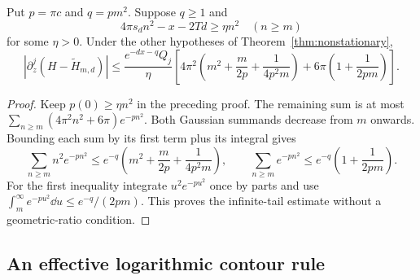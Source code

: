 \begin{lemma}\label{lem:gaussian-tail}
Put $p=\pi c$ and $q=pm^2$. Suppose $q\ge1$ and
\[
 4\pi s_d n^2-x-2Td\ge\eta n^2\quad(n\ge m)
\]
for some $\eta>0$. Under the other hypotheses of
Theorem~\ref{thm:nonstationary},
\begin{equation}\label{eq:gaussian-tail}
 \left|\partial_z^j(H-\widetilde H_{m,d})\right|
 \le\frac{e^{-dx-q}Q_j}{\eta}
 \left[4\pi^2\left(m^2+\frac m{2p}+\frac1{4p^2m}\right)
       +6\pi\left(1+\frac1{2pm}\right)\right].
\end{equation}
\end{lemma}
\begin{proof}
Keep $p(0)\ge\eta n^2$ in the preceding proof. The remaining sum
is at most $\sum_{n\ge m}(4\pi^2n^2+6\pi)e^{-pn^2}$.
Both Gaussian summands decrease from $m$ onwards. Bounding each
sum by its first term plus its integral gives
\[
 \sum_{n\ge m}n^2e^{-pn^2}
 \le e^{-q}\left(m^2+\frac m{2p}+\frac1{4p^2m}\right),\qquad
 \sum_{n\ge m}e^{-pn^2}\le e^{-q}\left(1+\frac1{2pm}\right).
\]
For the first inequality integrate $u^2e^{-pu^2}$ once by parts
and use $\int_m^\infty e^{-pu^2}\dd u\le e^{-q}/(2pm)$.
This proves the infinite-tail estimate without a geometric-ratio condition.
\end{proof}

\subsection{An effective logarithmic contour rule}

